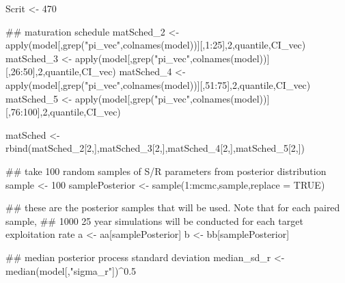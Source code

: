 \documentclass[
  11pt,
]{article}
\newenvironment{Shaded}{}{}
\newcommand{\CommentTok}[1]{\textcolor[rgb]{0.00,0.50,0.00}{#1}}
\newcommand{\DataTypeTok}[1]{#1}
\newcommand{\DecValTok}[1]{#1}
\newcommand{\FloatTok}[1]{#1}
\newcommand{\KeywordTok}[1]{\textcolor[rgb]{0.00,0.00,1.00}{#1}}
\newcommand{\NormalTok}[1]{#1}
\newcommand{\OperatorTok}[1]{#1}
\newcommand{\OtherTok}[1]{\textcolor[rgb]{1.00,0.25,0.00}{#1}}
\newcommand{\StringTok}[1]{\textcolor[rgb]{0.00,0.50,0.50}{#1}}
\begin{document}
\begin{Shaded}
\begin{Highlighting}[]
\NormalTok{Scrit <-}\StringTok{ }\DecValTok{470}


\CommentTok{## maturation schedule}
\NormalTok{matSched_}\DecValTok{2}\NormalTok{ <-}\StringTok{ }\KeywordTok{apply}\NormalTok{(model[,}\KeywordTok{grep}\NormalTok{(}\StringTok{"pi_vec"}\NormalTok{,}\KeywordTok{colnames}\NormalTok{(model))][,}\DecValTok{1}\OperatorTok{:}\DecValTok{25}\NormalTok{],}\DecValTok{2}\NormalTok{,quantile,CI_vec)}
\NormalTok{matSched_}\DecValTok{3}\NormalTok{ <-}\StringTok{ }\KeywordTok{apply}\NormalTok{(model[,}\KeywordTok{grep}\NormalTok{(}\StringTok{"pi_vec"}\NormalTok{,}\KeywordTok{colnames}\NormalTok{(model))][,}\DecValTok{26}\OperatorTok{:}\DecValTok{50}\NormalTok{],}\DecValTok{2}\NormalTok{,quantile,CI_vec)}
\NormalTok{matSched_}\DecValTok{4}\NormalTok{ <-}\StringTok{ }\KeywordTok{apply}\NormalTok{(model[,}\KeywordTok{grep}\NormalTok{(}\StringTok{"pi_vec"}\NormalTok{,}\KeywordTok{colnames}\NormalTok{(model))][,}\DecValTok{51}\OperatorTok{:}\DecValTok{75}\NormalTok{],}\DecValTok{2}\NormalTok{,quantile,CI_vec)}
\NormalTok{matSched_}\DecValTok{5}\NormalTok{ <-}\StringTok{ }\KeywordTok{apply}\NormalTok{(model[,}\KeywordTok{grep}\NormalTok{(}\StringTok{"pi_vec"}\NormalTok{,}\KeywordTok{colnames}\NormalTok{(model))][,}\DecValTok{76}\OperatorTok{:}\DecValTok{100}\NormalTok{],}\DecValTok{2}\NormalTok{,quantile,CI_vec)}

\NormalTok{matSched <-}\StringTok{ }\KeywordTok{rbind}\NormalTok{(matSched_}\DecValTok{2}\NormalTok{[}\DecValTok{2}\NormalTok{,],matSched_}\DecValTok{3}\NormalTok{[}\DecValTok{2}\NormalTok{,],matSched_}\DecValTok{4}\NormalTok{[}\DecValTok{2}\NormalTok{,],matSched_}\DecValTok{5}\NormalTok{[}\DecValTok{2}\NormalTok{,])}


\CommentTok{## take 100 random samples of S/R parameters from posterior distribution}
\NormalTok{sample <-}\StringTok{ }\DecValTok{100}
\NormalTok{samplePosterior <-}\StringTok{ }\KeywordTok{sample}\NormalTok{(}\DecValTok{1}\OperatorTok{:}\NormalTok{mcmc,sample,}\DataTypeTok{replace =} \OtherTok{TRUE}\NormalTok{)}

\CommentTok{## these are the posterior samples that will be used. Note that for each paired sample,}
\CommentTok{## 1000 25 year simulations will be conducted for each target exploitation rate}
\NormalTok{a <-}\StringTok{ }\NormalTok{aa[samplePosterior]}
\NormalTok{b <-}\StringTok{ }\NormalTok{bb[samplePosterior]}


\CommentTok{## median posterior process standard deviation}
\NormalTok{median_sd_r <-}\KeywordTok{median}\NormalTok{(model[,}\StringTok{"sigma_r"}\NormalTok{])}\OperatorTok{^}\FloatTok{0.5}


\end{Highlighting}
\end{Shaded}
\end{document}
